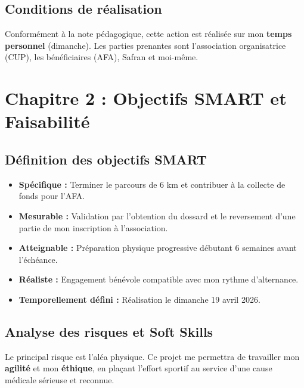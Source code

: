\subsection*{Conditions de réalisation}
{}
Conformément à la note pédagogique, cette action est réalisée sur mon \textbf{temps personnel} (dimanche). Les parties prenantes sont l'association organisatrice (CUP), les bénéficiaires (AFA), Safran et moi-même.

\newpage

\section*{Chapitre 2 : Objectifs SMART et Faisabilité}

\subsection*{Définition des objectifs SMART}
{}
\begin{itemize}
    \item \textbf{Spécifique :} Terminer le parcours de 6 km et contribuer à la collecte de fonds pour l'AFA.
    \item \textbf{Mesurable :} Validation par l'obtention du dossard et le reversement d'une partie de mon inscription à l'association.
    \item \textbf{Atteignable :} Préparation physique progressive débutant 6 semaines avant l'échéance.
    \item \textbf{Réaliste :} Engagement bénévole compatible avec mon rythme d'alternance.
    \item \textbf{Temporellement défini :} Réalisation le dimanche 19 avril 2026.
\end{itemize}

\subsection*{Analyse des risques et Soft Skills}
{}
Le principal risque est l'aléa physique. Ce projet me permettra de travailler mon \textbf{agilité} et mon \textbf{éthique}, en plaçant l'effort sportif au service d'une cause médicale sérieuse et reconnue.

